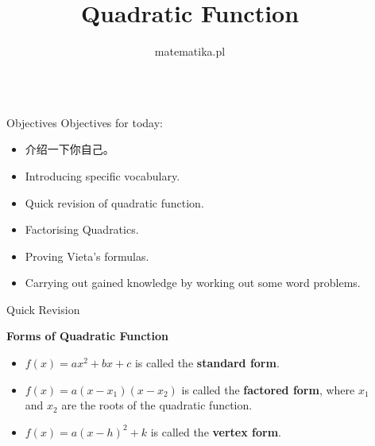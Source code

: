 \documentclass[final]{beamer}
\title{Quadratic Function} %
\author{matematika.pl} %
\institute{2015} %
\newlength{\sepwid}
\newlength{\onecolwid}
\begin{document}

\setlength{\belowcaptionskip}{2ex} %
\setlength\belowdisplayshortskip{2ex} %

\begin{frame}[t] %

\begin{columns}[t] %

\begin{column}{\sepwid}\end{column} %

\begin{column}{\onecolwid} %


\begin{alertblock}{Objectives}
Objectives for today:
\begin{itemize}
\item 介绍一下你自己。
\item Introducing specific vocabulary.
\item Quick revision of quadratic function.
\item Factorising Quadratics.
\item Proving Vieta's formulas.
\item Carrying out gained knowledge by working out some word problems.
\end{itemize}

\end{alertblock}


\begin{block}{Quick Revision}

\textbf{Forms of Quadratic Function}
\begin{itemize}
\item $f(x) = ax^2+bx+c$ is called the \textbf{standard form}.
\item $f(x) = a(x-x_1)(x-x_2)$ is called the \textbf{factored form}, where $x_1$ and $x_2$ are the roots of the quadratic function.
\item $f(x) = a(x-h)^2+k$ is called the \textbf{vertex form}.
\end{itemize}


\end{block}
\end{column}
\end{columns}
\end{frame}
\end{document}
